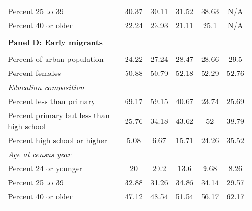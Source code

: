 \begin{tabular}{rccccc}
\multicolumn{1}{l}{        Percent 25 to 39} & 30.37 & 30.11 & 31.52 & 38.63 & N/A \\
\multicolumn{1}{l}{        Percent 40 or older} & 22.24 & 23.93 & 21.11 & 25.1  & N/A \\
      &       &       &       &       &  \\
\multicolumn{6}{l}{\textbf{Panel D: Early migrants}} \\
      &       &       &       &       &  \\
\multicolumn{1}{l}{    Percent of urban population} & 24.22 & 27.24 & 28.47 & 28.66 & 29.5 \\
\multicolumn{1}{l}{    Percent females} & 50.88 & 50.79 & 52.18 & 52.29 & 52.76 \\
\multicolumn{1}{l}{\textit{Education composition}} &       &       &       &       &  \\
\multicolumn{1}{l}{        Percent less than primary} & 69.17 & 59.15 & 40.67 & 23.74 & 25.69 \\
\multicolumn{1}{l}{        Percent primary but less than high school} & 25.76 & 34.18 & 43.62 & 52    & 38.79 \\
\multicolumn{1}{l}{        Percent high school or higher} & 5.08  & 6.67  & 15.71 & 24.26 & 35.52 \\
\multicolumn{1}{l}{\textit{Age at census year}} &       &       &       &       &  \\
\multicolumn{1}{l}{        Percent 24 or younger} & 20    & 20.2  & 13.6  & 9.68  & 8.26 \\
\multicolumn{1}{l}{        Percent 25 to 39} & 32.88 & 31.26 & 34.86 & 34.14 & 29.57 \\
\multicolumn{1}{l}{        Percent 40 or older} & 47.12 & 48.54 & 51.54 & 56.17 & 62.17 \\
      &       &       &       &       &  \\
\bottomrule
\end{tabular}%
